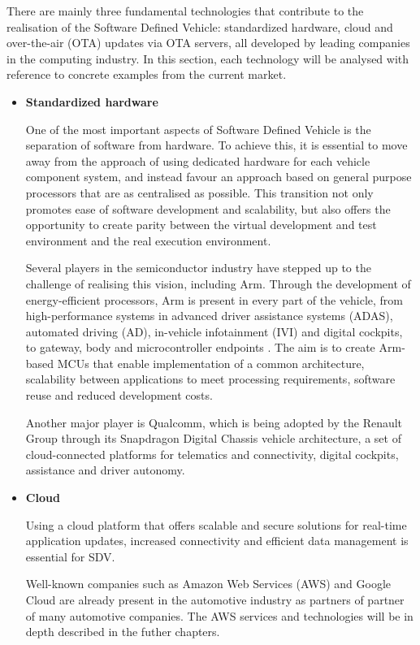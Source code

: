 There are mainly three fundamental technologies that contribute to the realisation of the Software Defined Vehicle: standardized hardware, cloud and over-the-air (OTA) updates via OTA servers, all developed by leading companies in the computing industry. In this section, each technology will be analysed with reference to concrete examples from the current market.

\begin{itemize}
    \item \textbf{Standardized hardware} 
    
    One of the most important aspects of Software Defined Vehicle is the separation of software from hardware. To achieve this, it is essential to move away from the approach of using dedicated hardware for each vehicle component system, and instead favour an approach based on general purpose processors that are as centralised as possible. This transition not only promotes ease of software development and scalability, but also offers the opportunity to create parity between the virtual development and test environment and the real execution environment.
    
    Several players in the semiconductor industry have stepped up to the challenge of realising this vision, including Arm. Through the development of energy-efficient processors, Arm is present in every part of the vehicle, from high-performance systems in advanced driver assistance systems (ADAS), automated driving (AD), in-vehicle infotainment (IVI) and digital cockpits, to gateway, body and microcontroller endpoints \cite{ArmAutomotive}. The aim is to create Arm-based MCUs that enable implementation of a common architecture, scalability between applications to meet processing requirements, software reuse and reduced development costs.
    
    Another major player is Qualcomm, which is being adopted by the Renault Group through its Snapdragon Digital Chassis vehicle architecture, a set of cloud-connected platforms for telematics and connectivity, digital cockpits, assistance and driver autonomy.

    \item \textbf{Cloud} 
    
    Using a cloud platform that offers scalable and secure solutions for real-time application updates, increased connectivity and efficient data management is essential for SDV. 

    Well-known companies such as Amazon Web Services (AWS) and Google Cloud are already present in the automotive industry as partners of partner of many automotive companies. The AWS services and technologies will be in depth described in the futher chapters.
 

\end{itemize}
